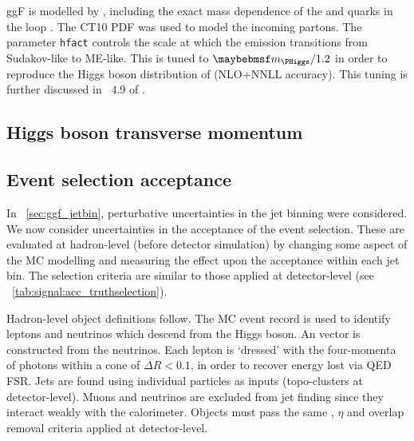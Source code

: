 
ggF is modelled by , including the exact mass 
dependence of the \Ptop and \Pbottom quarks in the loop \cite{Powheg-ggF-quarkmasses}. 
The CT10 PDF \cite{CTEQ} was used to model the incoming partons.
The \powhegbox parameter \verb|hfact| controls the scale at which the emission 
transitions from Sudakov-like to ME-like. This is tuned to $\mH/1.2$ in order to 
reproduce the Higgs boson \pt distribution of \hqt \cite{HqT2} (NLO+NNLL accuracy). This 
tuning is further discussed in \Section~4.9 of \Reference \cite{YR2}.



\subsection{Higgs boson transverse momentum}
\label{sec:ggF:pt}



\subsection{Event selection acceptance}
\label{sec:ggF:acc}

In \Section~\ref{sec:ggf_jetbin}, perturbative uncertainties in the jet binning were 
considered. We now consider uncertainties in the acceptance of the event selection. These 
are evaluated at hadron-level (\ie before detector simulation) by changing some aspect of 
the MC modelling and measuring the effect upon the acceptance within each jet bin. 
The selection criteria are similar to those applied at detector-level (see 
\Table~\ref{tab:signal:acc_truthselection}).

Hadron-level object definitions follow. The MC event record is used to identify leptons 
and neutrinos which descend from the Higgs boson. An \metvec vector is constructed from 
the neutrinos. Each lepton is `dressed' with the four-momenta of photons within a cone of 
$\Delta R < 0.1$, in order to recover energy lost via QED FSR. Jets are found using 
individual particles as inputs (\cf topo-clusters at detector-level). Muons and neutrinos 
are excluded from jet finding since they interact weakly with the calorimeter. Objects 
must pass the same \pt, $\eta$ and overlap removal criteria applied at detector-level.

